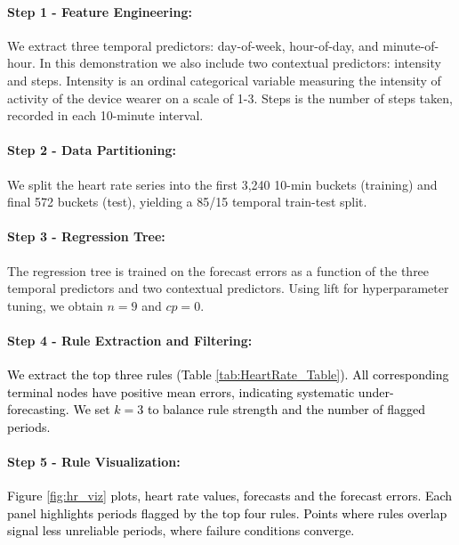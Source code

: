 \documentclass[12pt]{article}
\newcommand{\matt}[1]{\textcolor{black}{#1}}
\begin{document}
\paragraph{Step 1 - Feature Engineering:}
We extract three temporal predictors: day-of-week, hour-of-day, and minute-of-hour. In this demonstration we also include two contextual predictors: intensity and steps. Intensity is an ordinal categorical variable measuring the intensity of activity of the device wearer on a scale of 1-3. Steps is the number of steps taken, recorded in each 10-minute interval.

\paragraph{Step 2 - Data Partitioning:}
We split the heart rate series into the first 3,240 10-min buckets (training) and final 572 buckets (test), yielding a 85/15 temporal train-test split.

\paragraph{Step 3 - Regression Tree:}
The regression tree is trained on the forecast errors as a function of the three temporal predictors and two contextual predictors. Using lift for hyperparameter tuning, we obtain  $n = 9$ and $cp = 0$.

\paragraph{Step 4 - Rule Extraction and Filtering:}
\matt{We extract the top three rules (Table \ref{tab:HeartRate_Table}). All corresponding terminal nodes have positive mean errors, indicating systematic under-forecasting. We set $k=3$ to balance rule strength and the number of flagged periods.}%

\paragraph{Step 5 - Rule Visualization:}
\matt{Figure \ref{fig:hr_viz} plots, heart rate values, forecasts and the forecast errors. Each panel highlights periods flagged by the top four rules. Points where rules overlap signal less unreliable periods, where failure conditions converge.}
\end{document}
